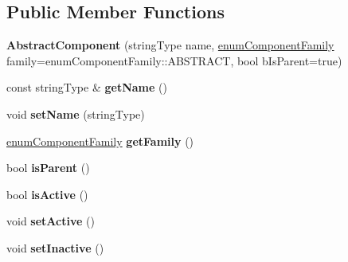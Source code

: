 \subsection*{Public Member Functions}
\begin{DoxyCompactItemize}
\item 
\hypertarget{classAbstractComponent_a1d139b9823d9a0626f85e4faa8605de6}{{\bfseries Abstract\-Component} (string\-Type name, \hyperlink{AbstractComponent_8hpp_a3be2c3a78b2355914f50f3966ac68542}{enum\-Component\-Family} family=enum\-Component\-Family\-::\-A\-B\-S\-T\-R\-A\-C\-T, bool b\-Is\-Parent=true)}\label{classAbstractComponent_a1d139b9823d9a0626f85e4faa8605de6}

\item 
\hypertarget{classAbstractComponent_a80312cffd5dadbd5ac608f2ea3785910}{const string\-Type \& {\bfseries get\-Name} ()}\label{classAbstractComponent_a80312cffd5dadbd5ac608f2ea3785910}

\item 
\hypertarget{classAbstractComponent_ad2f07b73b1ee53da9e0165c63df9d6a9}{void {\bfseries set\-Name} (string\-Type)}\label{classAbstractComponent_ad2f07b73b1ee53da9e0165c63df9d6a9}

\item 
\hypertarget{classAbstractComponent_a4fd419062ca398e8daa93ae971631efd}{\hyperlink{AbstractComponent_8hpp_a3be2c3a78b2355914f50f3966ac68542}{enum\-Component\-Family} {\bfseries get\-Family} ()}\label{classAbstractComponent_a4fd419062ca398e8daa93ae971631efd}

\item 
\hypertarget{classAbstractComponent_adfd1328746d5a1fdbe79bf02463a7577}{bool {\bfseries is\-Parent} ()}\label{classAbstractComponent_adfd1328746d5a1fdbe79bf02463a7577}

\item 
\hypertarget{classAbstractComponent_a5b9476ee845f143e86a7a98e60e5e0f7}{bool {\bfseries is\-Active} ()}\label{classAbstractComponent_a5b9476ee845f143e86a7a98e60e5e0f7}

\item 
\hypertarget{classAbstractComponent_ad83cebc6a71c3933a949d92bbb914ba2}{void {\bfseries set\-Active} ()}\label{classAbstractComponent_ad83cebc6a71c3933a949d92bbb914ba2}

\item 
\hypertarget{classAbstractComponent_a58077d6af815efd50097af8a432ed0d9}{void {\bfseries set\-Inactive} ()}\label{classAbstractComponent_a58077d6af815efd50097af8a432ed0d9}


\end{DoxyCompactItemize}
